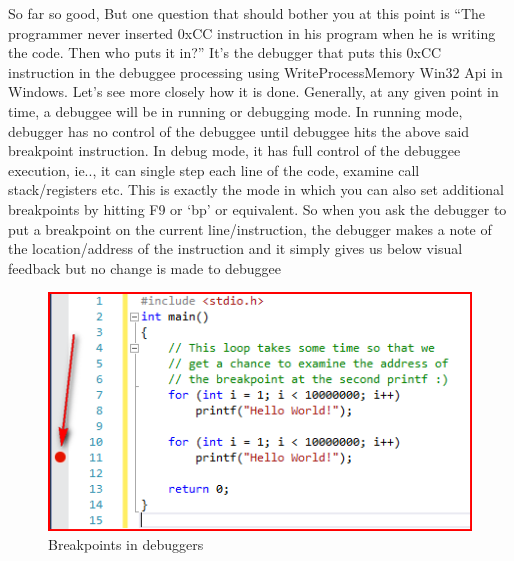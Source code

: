 \documentclass{article}
\begin{document}
So far so good, But one question that should bother you at this point is “The programmer never inserted 0xCC instruction in his program when he is writing the code. Then who puts it in?” It’s the debugger that puts this 0xCC instruction in the debuggee processing using WriteProcessMemory Win32 Api in Windows. Let’s see more closely how it is done. Generally, at any given point in time, a debuggee will be in running or debugging mode. In running mode, debugger has no control of the debuggee until debuggee hits the above said breakpoint instruction. In debug mode, it has full control of the debuggee execution, ie.., it can single step each line of the code, examine call stack/registers etc. This is exactly the mode in which you can also set additional breakpoints by hitting F9 or ‘bp’ or equivalent. So when you ask the debugger to put a breakpoint on the current line/instruction, the debugger makes  a note of the location/address of the instruction and it simply gives us below visual feedback but no change is made to debuggee

\begin{figure}[H]
\centering
\includegraphics[width=\textwidth]{1.Breakpoints-in-Debuggers.png}
\caption{Breakpoints in debuggers}
\end{figure}
\end{document}
